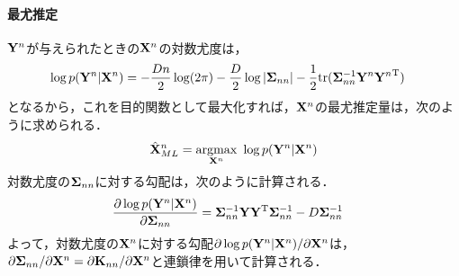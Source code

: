 \documentclass[11pt,a4j]{article}
\begin{document}
        \paragraph{最尤推定}
          ${\bf Y}^n$が与えられたときの${\bf X}^n$の対数尤度は，
          \begin{align}
            \log p({\bf Y}^n|{\bf X}^n)
            &= -\frac{Dn}{2} \log (2 \pi) - \frac{D}{2} \log |{\bf \Sigma}_{nn}| - \frac{1}{2} {\rm tr} ({\bf \Sigma}_{nn}^{-1} {{\bf Y}^n}{{\bf Y}^n}^{\mathrm{T}})
          \end{align}
          となるから，これを目的関数として最大化すれば，${\bf X}^n$の最尤推定量は，次のように求められる．
          \begin{align}
            \hat{\bf X}^{n}_{ML} &= \underset{{\bf X}^n}{\rm argmax} ~ \log p( {\bf Y}^n | {\bf X}^n) \\
          \end{align}
          対数尤度の${\bf \Sigma}_{nn}$に対する勾配は，次のように計算される．
          \begin{align}
            \frac{\partial \log p({\bf Y}^n|{\bf X}^n)}{\partial {\bf \Sigma}_{nn}} &= {\bf \Sigma}_{nn}^{-1} {\bf Y}{\bf Y}^{\mathrm{T}} {\bf \Sigma}_{nn}^{-1} - D {\bf \Sigma}_{nn}^{-1} 
          \end{align}
          よって，対数尤度の${\bf X}^n$に対する勾配$\partial \log p({\bf Y}^n|{\bf X}^n) / \partial {\bf X}^n$は，
          $\partial {\bf \Sigma}_{nn} / \partial {\bf X}^n = \partial {\bf K}_{nn} / \partial {\bf X}^n$と連鎖律を用いて計算される．
\end{document}
